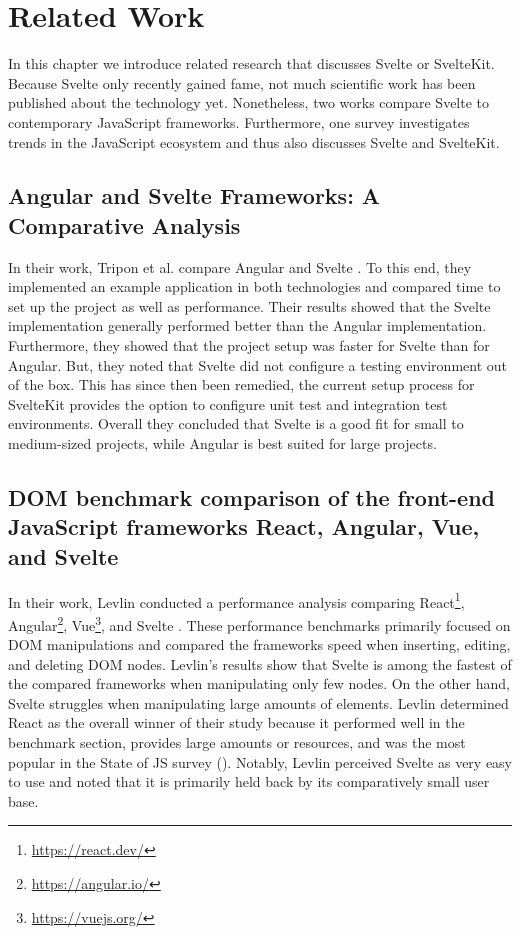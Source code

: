 \chapter{Related Work}
\label{ch:related-work}

In this chapter we introduce related research that discusses Svelte or SvelteKit. Because Svelte only recently gained fame, not much scientific work has been published about the technology yet. Nonetheless, two works compare Svelte to contemporary JavaScript frameworks. Furthermore, one survey investigates trends in the JavaScript ecosystem and thus also discusses Svelte and SvelteKit.

\section{Angular and Svelte Frameworks: A Comparative Analysis}
In their work, Tripon et al. compare Angular and Svelte \cite{tripon_angular_2021}. To this end, they implemented an example application in both technologies and compared time to set up the project as well as performance. Their results showed that the Svelte implementation generally performed better than the Angular implementation. Furthermore, they showed that the project setup was faster for Svelte than for Angular. But, they noted that Svelte did not configure a testing environment out of the box. This has since then been remedied, the current setup process for SvelteKit provides the option to configure unit test and integration test environments. Overall they concluded that Svelte is a good fit for small to medium-sized projects, while Angular is best suited for large projects.  

\section{DOM benchmark comparison of the front-end JavaScript frameworks React, Angular, Vue, and Svelte}
In their work, Levlin conducted a performance analysis comparing React\footnote{\url{https://react.dev/}}, Angular\footnote{\url{https://angular.io/}}, Vue\footnote{\url{https://vuejs.org/}}, and Svelte \cite{levlin_dom_2020}. These performance benchmarks primarily focused on DOM manipulations and compared the frameworks speed when inserting, editing, and deleting DOM nodes. Levlin's results show that Svelte is among the fastest of the compared frameworks when manipulating only few nodes. On the other hand, Svelte struggles when manipulating large amounts of elements. Levlin determined React as the overall winner of their study because it performed well in the benchmark section, provides large amounts or resources, and was the most popular in the State of JS survey (). Notably, Levlin perceived Svelte as very easy to use and noted that it is primarily held back by its comparatively small user base.   

